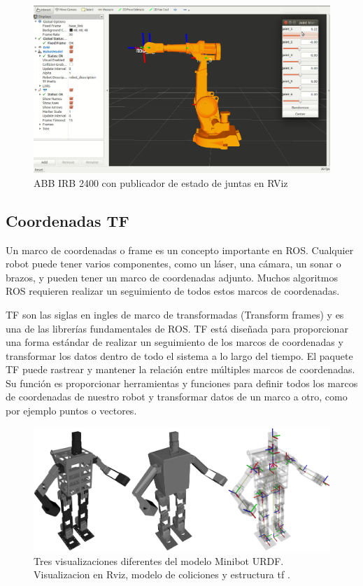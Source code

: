         \begin{figure}[htb]
            \centering
            \includegraphics[width=0.8\linewidth]{Main/Chapter3/Images3/interfaz-rviz.png}
            \caption{ABB IRB 2400 con publicador de estado de juntas en RViz \cite{lentin_20188}}
            \label{f:Cap3-6_interfaz_rviz}
        \end{figure}
        
        \newpage
    
    \subsection{Coordenadas TF}
    
        Un marco de coordenadas o frame es un concepto importante en ROS. Cualquier robot puede tener varios componentes, como un láser, una cámara, un sonar o brazos, y pueden tener un marco de coordenadas adjunto. Muchos algoritmos ROS requieren realizar un seguimiento de todos estos marcos de coordenadas.
        
        TF son las siglas en ingles de marco de transformadas (Transform frames) y es una de las librerías fundamentales de ROS. TF está diseñada para proporcionar una forma estándar de realizar un seguimiento de los marcos de coordenadas y transformar los datos dentro de todo el sistema a lo largo del tiempo. El paquete TF puede rastrear y mantener la relación entre múltiples marcos de coordenadas. Su función es proporcionar herramientas y funciones para definir todos los marcos de coordenadas de nuestro robot y transformar datos de un marco a otro, como por ejemplo puntos o vectores.
        
        \begin{figure}[htb]
            \centering
            \includegraphics[width=1.0\linewidth]{Main/Chapter3/Images3/3-6/ejemplo-multiples-frames-rviz.png}
            \caption{Tres visualizaciones diferentes del modelo Minibot URDF. Visualizacion en Rviz, modelo de coliciones y estructura tf  \cite{phdthesistfhuman}. }
            \label{f:Cap3-6_frames_rviz}
        \end{figure}
        
